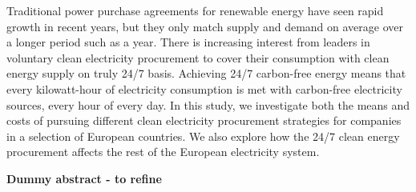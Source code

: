 Traditional power purchase agreements for renewable energy have seen rapid growth in recent years, but they only match supply and demand on average over a longer period such as a year.
There is increasing interest from leaders in voluntary clean electricity procurement to cover their consumption with clean energy supply on truly 24/7 basis. 
Achieving 24/7 carbon-free energy means that every kilowatt-hour of electricity consumption is met with carbon-free electricity sources, every hour of every day.
In this study, we investigate both the means and costs of pursuing different clean electricity procurement strategies for companies in a selection of European countries.
We also explore how the 24/7 clean energy procurement affects the rest of the European electricity system.

\bf{Dummy abstract - to refine}
